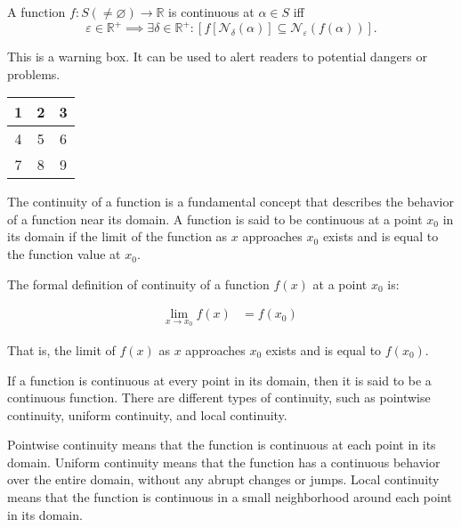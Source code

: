 \documentclass[12pt,openany]{book}
\theoremstyle{definition}
\newcommand{\R}{\mathbb{R}}
\newcommand{\nbhd}{\mathcal{N}}
\newcommand{\of}[1]{\left( #1 \right)}
\begin{document}
	\begin{tcolorbox}[colback=white!10!white,colframe=blue!50!black,title=Continuity]
		A function $f:S(\neq\varnothing)\to\R$ is continuous at $\alpha\in S$ iff \[
		\varepsilon\in\R^+\implies\exists\delta\in\R^+:[f\left[\nbhd_\delta\of{\alpha}\right]\subseteq\nbhd_\varepsilon\of{f\of{\alpha}}].
		\]
	\end{tcolorbox}

	\begin{tcolorbox}[colback=red!5!white,colframe=red!75!black,title=Warning]
		This is a warning box. It can be used to alert readers to potential dangers or problems.
	\end{tcolorbox}

	\begin{tcolorbox}[colback=white!10!white,colframe=black!50!white,title=Tabular Box,fonttitle=\bfseries\large,sharp corners]
		\begin{tabular}{|c|c|c|}
			\hline
			1 & 2 & 3 \\
			\hline
			4 & 5 & 6 \\
			\hline
			7 & 8 & 9 \\
			\hline
		\end{tabular}
	\end{tcolorbox}

	
	The continuity of a function is a fundamental concept that describes the behavior of a function near its domain. A function is said to be continuous at a point $x_0$ in its domain if the limit of the function as $x$ approaches $x_0$ exists and is equal to the function value at $x_0$.
	
	The formal definition of continuity of a function $f(x)$ at a point $x_0$ is:
	
	\begin{align*}
		\lim_{x \to x_0}f(x) &= f(x_0)\
	\end{align*}
	
	That is, the limit of $f(x)$ as $x$ approaches $x_0$ exists and is equal to $f(x_0)$.
	
	If a function is continuous at every point in its domain, then it is said to be a continuous function. There are different types of continuity, such as pointwise continuity, uniform continuity, and local continuity.
	
	Pointwise continuity means that the function is continuous at each point in its domain. Uniform continuity means that the function has a continuous behavior over the entire domain, without any abrupt changes or jumps. Local continuity means that the function is continuous in a small neighborhood around each point in its domain.
	
\end{document}
